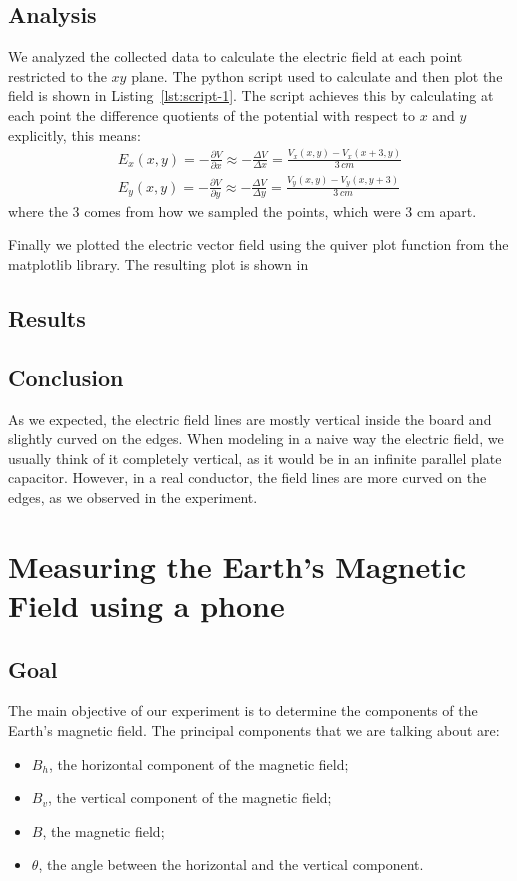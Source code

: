 \documentclass[notitlepage]{report}
\numberwithin{equation}{section}
\theoremstyle{plain}
\theoremstyle{definition}
\theoremstyle{remark}
\begin{document}
\section{Analysis}
We analyzed the collected data to calculate the electric field at each point
restricted to the \(xy\) plane. The python script used to calculate and then
plot the field is shown in Listing~\ref{lst:script-1}. The script
achieves this by calculating at each point the difference quotients of the
potential with respect to \(x\) and \(y\) explicitly, this means:
\begin{align}
    E_x(x, y) = -\frac{\partial V}{\partial x} \approx -\frac{\Delta V}{\Delta
    x} = \frac{V_x{(x, y)} - V_x{(x+3, y)}}{3\,cm}\label{eq:diff-quotients_x}\\
    E_y(x, y) =  -\frac{\partial V}{\partial y} \approx -\frac{\Delta V}{\Delta
    y} = \frac{V_y{(x, y)} - V_y{(x, y+3)}}{3\,cm}\label{eq:diff-quotients_y}
\end{align}
where the 3 comes from how we sampled the points, which were 3 cm apart. 



Finally we plotted the electric vector field using the quiver plot function from
the matplotlib library. The resulting plot is shown in
\section{Results}
\section{Conclusion}
As we expected, the electric field lines are mostly vertical inside the board
and slightly curved on the edges. When modeling in a naive way the electric
field, we usually think of it completely vertical, as it would be in an infinite
parallel plate capacitor. However, in a real conductor, the field lines are more
curved on the edges, as we observed in the experiment. 

\chapter{Measuring the Earth’s Magnetic Field using a phone}

\section{Goal}
The main objective of our experiment is to determine the components of the Earth’s magnetic field. The principal components that we are talking about are: 
\begin{itemize}
    \item $B_h$, the horizontal component of the magnetic field;
    \item $B_v$, the vertical component of the magnetic field;
    \item $B$, the magnetic field;
    \item $\theta$, the angle between the horizontal and the vertical component.
\end{itemize}
\end{document}
